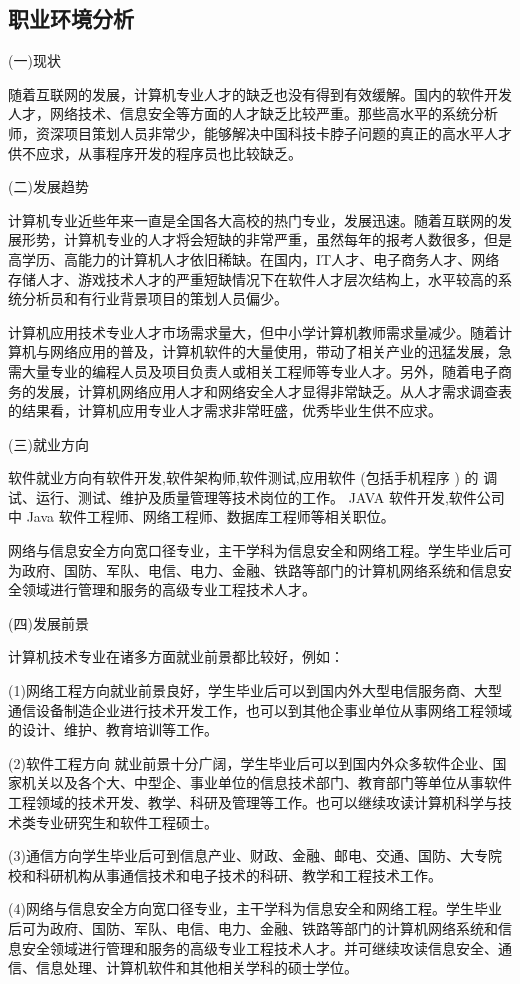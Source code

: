 \documentclass{article}
\begin{document}
\subsection{职业环境分析}
(一)现状\par
随着互联网的发展，计算机专业人才的缺乏也没有得到有效缓解。国内的软件开发人才，网络技术、信息安全等方面的人才缺乏比较严重。那些高水平的系统分析师，资深项目策划人员非常少，能够解决中国科技卡脖子问题的真正的高水平人才供不应求，从事程序开发的程序员也比较缺乏。\par
(二)发展趋势\par
计算机专业近些年来一直是全国各大高校的热门专业，发展迅速。随着互联网的发展形势，计算机专业的人才将会短缺的非常严重，虽然每年的报考人数很多，但是高学历、高能力的计算机人才依旧稀缺。在国内，IT人才、电子商务人才、网络存储人才、游戏技术人才的严重短缺情况下在软件人才层次结构上，水平较高的系统分析员和有行业背景项目的策划人员偏少。\par
计算机应用技术专业人才市场需求量大，但中小学计算机教师需求量减少。随着计算机与网络应用的普及，计算机软件的大量使用，带动了相关产业的迅猛发展，急需大量专业的编程人员及项目负责人或相关工程师等专业人才。另外，随着电子商务的发展，计算机网络应用人才和网络安全人才显得非常缺乏。从人才需求调查表的结果看，计算机应用专业人才需求非常旺盛，优秀毕业生供不应求。\par
(三)就业方向\par
软件就业方向有软件开发,软件架构师,软件测试,应用软件 (包括手机程序 ) 的 调试、运行、测试、维护及质量管理等技术岗位的工作。 JAVA 软件开发,软件公司中 Java 软件工程师、网络工程师、数据库工程师等相关职位。\par
网络与信息安全方向宽口径专业，主干学科为信息安全和网络工程。学生毕业后可为政府、国防、军队、电信、电力、金融、铁路等部门的计算机网络系统和信息安全领域进行管理和服务的高级专业工程技术人才。\par
(四)发展前景\par
计算机技术专业在诸多方面就业前景都比较好，例如：\par
(1)网络工程方向就业前景良好，学生毕业后可以到国内外大型电信服务商、大型通信设备制造企业进行技术开发工作，也可以到其他企事业单位从事网络工程领域的设计、维护、教育培训等工作。\par
(2)软件工程方向 就业前景十分广阔，学生毕业后可以到国内外众多软件企业、国家机关以及各个大、中型企、事业单位的信息技术部门、教育部门等单位从事软件工程领域的技术开发、教学、科研及管理等工作。也可以继续攻读计算机科学与技术类专业研究生和软件工程硕士。\par
(3)通信方向学生毕业后可到信息产业、财政、金融、邮电、交通、国防、大专院校和科研机构从事通信技术和电子技术的科研、教学和工程技术工作。\par
(4)网络与信息安全方向宽口径专业，主干学科为信息安全和网络工程。学生毕业后可为政府、国防、军队、电信、电力、金融、铁路等部门的计算机网络系统和信息安全领域进行管理和服务的高级专业工程技术人才。并可继续攻读信息安全、通信、信息处理、计算机软件和其他相关学科的硕士学位。\par
\end{document}
